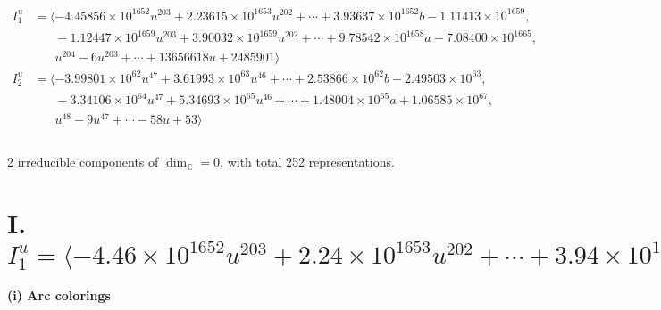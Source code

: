 \documentclass[1p]{elsarticle_modified}
\theoremstyle{definition}
\begin{document}
\begin{align*}
I^u_{1}&=\langle 
-4.45856\times10^{1652} u^{203}+2.23615\times10^{1653} u^{202}+\cdots+3.93637\times10^{1652} b-1.11413\times10^{1659},\\
\phantom{I^u_{1}}&\phantom{= \langle  }-1.12447\times10^{1659} u^{203}+3.90032\times10^{1659} u^{202}+\cdots+9.78542\times10^{1658} a-7.08400\times10^{1665},\\
\phantom{I^u_{1}}&\phantom{= \langle  }u^{204}-6 u^{203}+\cdots+13656618 u+2485901\rangle \\
I^u_{2}&=\langle 
-3.99801\times10^{62} u^{47}+3.61993\times10^{63} u^{46}+\cdots+2.53866\times10^{62} b-2.49503\times10^{63},\\
\phantom{I^u_{2}}&\phantom{= \langle  }-3.34106\times10^{64} u^{47}+5.34693\times10^{65} u^{46}+\cdots+1.48004\times10^{65} a+1.06585\times10^{67},\\
\phantom{I^u_{2}}&\phantom{= \langle  }u^{48}-9 u^{47}+\cdots-58 u+53\rangle \\
\\
\end{align*}
\raggedright * 2 irreducible components of $\dim_{\mathbb{C}}=0$, with total 252 representations.\\
\newpage
\renewcommand{\arraystretch}{1}
\centering \section*{I. $I^u_{1}= \langle -4.46\times10^{1652} u^{203}+2.24\times10^{1653} u^{202}+\cdots+3.94\times10^{1652} b-1.11\times10^{1659},\;-1.12\times10^{1659} u^{203}+3.90\times10^{1659} u^{202}+\cdots+9.79\times10^{1658} a-7.08\times10^{1665},\;u^{204}-6 u^{203}+\cdots+13656618 u+2485901 \rangle$}
\flushleft \textbf{(i) Arc colorings}\\
\end{document}
